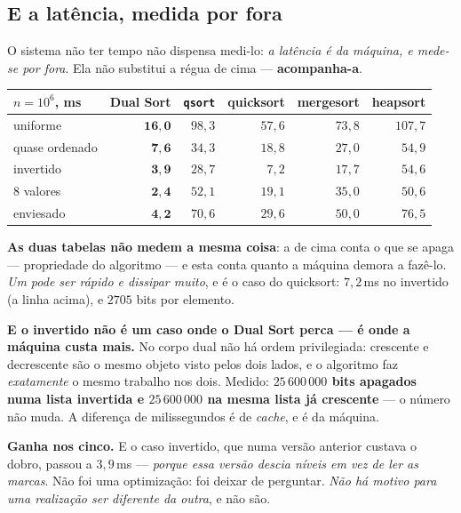 \documentclass[11pt,a4paper]{article}
\newcommand{\code}[1]{\texttt{\small #1}}
\begin{document}
\subsection*{E a latência, medida por fora}

O sistema não ter tempo não dispensa medi-lo: \emph{a latência é da máquina, e mede-se por fora}.
Ela não substitui a régua de cima --- \textbf{acompanha-a}.

\begin{center}\small
\begin{tabular}{@{}lrrrrr@{}}
\toprule
$n=10^{6}$, ms & \textbf{Dual Sort} & \code{qsort} & quicksort & mergesort & heapsort \\
\midrule
uniforme        & $\mathbf{16{,}0}$ & $98{,}3$ & $57{,}6$ & $73{,}8$ & $107{,}7$ \\
quase ordenado  & $\mathbf{7{,}6}$ & $34{,}3$ & $18{,}8$ & $27{,}0$ & $54{,}9$ \\
invertido       & $\mathbf{3{,}9}$ & $28{,}7$ & $7{,}2$ & $17{,}7$ & $54{,}6$ \\
$8$ valores     & $\mathbf{2{,}4}$ & $52{,}1$ & $19{,}1$ & $35{,}0$ & $50{,}6$ \\
enviesado       & $\mathbf{4{,}2}$ & $70{,}6$ & $29{,}6$ & $50{,}0$ & $76{,}5$ \\
\bottomrule
\end{tabular}
\end{center}

\noindent \textbf{As duas tabelas não medem a mesma coisa}: a de cima conta o que se apaga ---
propriedade do algoritmo --- e esta conta quanto a máquina demora a fazê-lo. \emph{Um pode ser
rápido e dissipar muito}, e é o caso do quicksort: $7{,}2$\,ms no invertido (a linha acima), e $2705$
bits por elemento.

\smallskip
\noindent \textbf{E o invertido não é um caso onde o Dual Sort perca --- é onde a máquina custa
mais.} No corpo dual não há ordem privilegiada: crescente e decrescente são o mesmo objeto visto
pelos dois lados, e o algoritmo faz \emph{exatamente} o mesmo trabalho nos dois. Medido:
\textbf{$25\,600\,000$ bits apagados numa lista invertida e $25\,600\,000$ na mesma lista já
crescente} --- o número não muda. A diferença de milissegundos é de \emph{cache}, e é da máquina.

\smallskip
\noindent \textbf{Ganha nos cinco.} E o caso invertido, que numa versão anterior custava o dobro,
passou a $3{,}9$\,ms --- \emph{porque essa versão descia níveis em vez de ler as marcas}. Não foi
uma optimização: foi deixar de perguntar. \emph{Não há motivo para uma realização ser diferente da
outra}, e não são.
\end{document}
